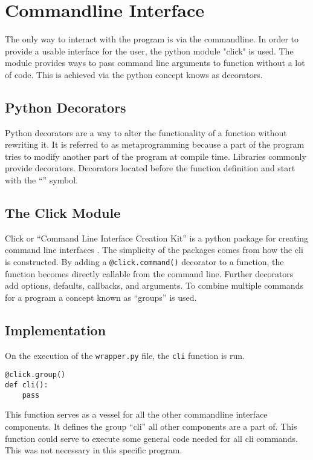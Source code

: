 \section{Commandline Interface}
The only way to interact with the program is via the commandline. In order to provide a usable interface for the user, the python module "click" is used. The module provides ways to pass command line arguments to function without a lot of code. This is achieved via the python concept knows as decorators.

\subsection{Python Decorators}
Python decorators are a way to alter the functionality of a function without rewriting it. It is referred to as metaprogramming because a part of the program tries to modify another part of the program at compile time. Libraries commonly provide decorators. Decorators located before the function definition and start with the \enquote{\@} symbol.

\subsection{The Click Module}
Click or \enquote{Command Line Interface Creation Kit} is a python package for creating command line interfaces \cite{click}. The simplicity of the packages comes from how the cli is constructed. By adding a \lstinline{@click.command()} decorator to a function, the function becomes directly callable from the command line. Further decorators add options, defaults, callbacks, and arguments. To combine multiple commands for a program a concept known as \enquote{groups} is used.

\subsection{Implementation}
On the execution of the \lstinline{wrapper.py} file, the \lstinline{cli} function is run.

\begin{lstlisting}
@click.group()
def cli():
    pass
\end{lstlisting}

This function serves as a vessel for all the other commandline interface components. It defines the group \enquote{cli} all other components are a part of. This function could serve to execute some general code needed for all cli commands. This was not necessary in this specific program.

